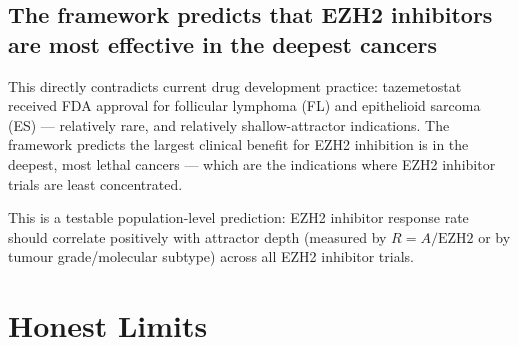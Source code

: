 \documentclass[11pt, a4paper]{article}
\begin{document}
\subsection{The framework predicts that EZH2 inhibitors
            are most effective in the deepest cancers}

This directly contradicts current drug development
practice: tazemetostat received FDA approval for
follicular lymphoma (FL) and epithelioid sarcoma (ES)
--- relatively rare, and relatively shallow-attractor
indications. The framework predicts the largest
clinical benefit for EZH2 inhibition is in the
deepest, most lethal cancers --- which are the
indications where EZH2 inhibitor trials are least
concentrated.

This is a testable population-level prediction:
EZH2 inhibitor response rate should correlate
positively with attractor depth (measured by
$R = A/\text{EZH2}$ or by tumour grade/molecular
subtype) across all EZH2 inhibitor trials.

\section{Honest Limits}
\label{sec:limits}
\end{document}
